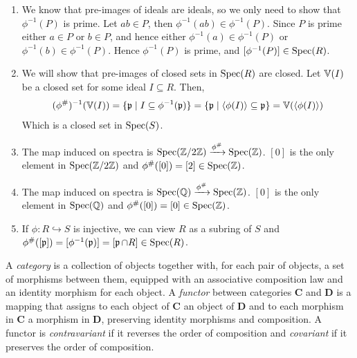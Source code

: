 \documentclass[Notebook.tex]{subfiles}
\begin{document}
\begin{solution}
    \bbni 
    \begin{enumerate}[label=(\alph*),ref=\theenumi\alph*]
        \item We know that pre-images of ideals are ideals, so we only need to show that $\phi^{-1}(P)$ is prime. Let $ab \in P$, then $\phi^{-1}(ab) \in \phi^{-1}(P)$. Since $P$ is prime either $a \in P$ or $b \in P$, and hence either $\phi^{-1}(a) \in \phi^{-1}(P)$ or $\phi^{-1}(b) \in \phi^{-1}(P)$. Hence $\phi^{-1}(P)$ is prime, and $[\phi^{-1}(P)] \in \operatorname{Spec}(R)$. 
        
        \item We will show that pre-images of closed sets in $\operatorname{Spec}(R)$ are closed. Let $\mathbb V(I)$ be a closed set for some ideal $I \subseteq R$. Then, 
        \[(\phi^{\#})^{-1}(\mathbb V(I)) = \{\operatorname{\mathfrak{p}} \mid I \subseteq \phi^{-1}(\operatorname{\mathfrak{p}})\} = \{\operatorname{\mathfrak{p}} \mid \langle \phi(I) \rangle \subseteq \operatorname{\mathfrak{p}}\} = \mathbb V(\langle \phi(I) \rangle )\]
        Which is a closed set in $\operatorname{Spec}(S)$.

        \item The map induced on spectra is $\operatorname{Spec}(\mathbb Z/2\mathbb Z) \xrightarrow{\phi^{\#}} \operatorname{Spec}(\mathbb Z)$. $[0]$ is the only element in $\operatorname{Spec}(\mathbb Z/2\mathbb Z)$ and $\phi^{\#}([0]) = [2] \in \operatorname{Spec}(\mathbb Z)$. 
        
        \item The map induced on spectra is $\operatorname{Spec}(\mathbb Q) \xrightarrow{\phi^{\#}} \operatorname{Spec}(\mathbb Z)$. $[0]$ is the only element in $\operatorname{Spec}(\mathbb Q)$ and $\phi^{\#}([0]) = [0] \in \operatorname{Spec}(\mathbb Z)$. 
        
        \item If $\phi: R \hookrightarrow S$ is injective, we can view $R$ as a subring of $S$ and $\phi^{\#}([\operatorname{\mathfrak{p}}]) = [\phi^{-1}(\operatorname{\mathfrak{p}})] = [\operatorname{\mathfrak{p}} \cap R] \in \operatorname{Spec}(R)$. 
    \end{enumerate}
\end{solution}

\newpage 

\hrulefill

A \emph{category} is a collection of objects together with, for each pair of objects, a set of morphisms between them, equipped with an associative composition law and an identity morphism for each object. A \emph{functor} between categories $\textbf{C}$ and $\textbf{D}$ is a mapping that assigns to each object of $\textbf{C}$ an object of $\textbf{D}$ and to each morphism in $\textbf{C}$ a morphism in $\textbf{D}$, preserving identity morphisms and composition. A functor is \emph{contravariant} if it reverses the order of composition and \emph{covariant} if it preserves the order of composition.
\end{document}
